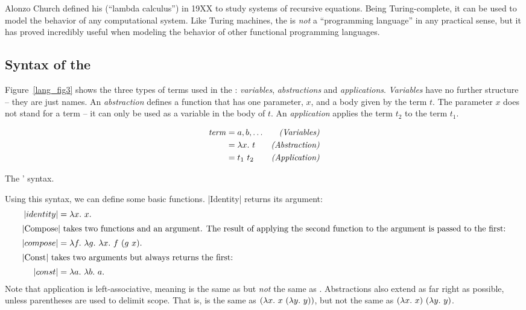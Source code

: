 \documentclass[12pt]{report}
\begin{document}
Alonzo Church defined his \lamA (``lambda calculus'') in 19XX
\citep{ChurchXX} to study systems of recursive equations. Being
Turing-complete, it can be used to model the behavior of any
computational system. Like Turing machines, the \lamA is \emph{not}
a ``programming language'' in any practical sense, but it has proved
incredibly useful when modeling the behavior of other functional
programming languages.

\subsection{Syntax of the \LamA}
\label{lang_sec1_syntax}

Figure~\ref{lang_fig3} shows the three types of terms used in the
\lamA: \emph{variables}, \emph{abstractions} and
\emph{applications}. \emph{Variables} have no further structure --
they are just names. An \emph{abstraction} defines a function that has
one parameter, $x$, and a body given by the term $t$. The parameter
$x$ does not stand for a term -- it can only be used as a variable in
the body of $t$.  An \emph{application} applies the term $t_2$ to the
term $t_1$.

\begin{myfig}[tbh]
  \begin{minipage}{5in}
    \begin{align*}
      \mathit{term} &= a, b, \ldots & \hfill\text{\emph{(Variables)}} \\
      &= \lamAbs{x}{t} & \hfill\text{\emph{(Abstraction)}} \\ 
      &= \lamApp{t_1}{t_2} & \hfill\text{\emph{(Application)}}
    \end{align*}
  \end{minipage}
  \caption{The \lamA' syntax.}
  \label{lang_fig3}
\end{myfig}

Using this syntax, we can define some basic functions. |Identity|
returns its argument:
\begin{align}
  |identity| &= \lambda x.\ x. \label{lang_eq1} \\
  \intertext{|Compose| takes two functions and an argument. The result of
    applying the second function to the argument is passed to the first:}
  |compose| &= \lambda f.\ \lambda g.\ \lambda x.\ f\ (g\ x). \label{lang_eq_compose1} \\
  \intertext{|Const| takes two arguments but always returns the first:}
  |const| &= \lambda a.\ \lambda b.\ a. \label{lang_eq_const1} 
\end{align}
Note that application is left-associative, meaning
 is the same as 
but \emph{not} the same as . Abstractions
also extend as far right as possible, unless parentheses are used to
delimit scope. That is,  is the
same as $(\lambda x.\ x\ (\lambda y.\ y))$, but not the
same as $(\lambda x.\ x)\ (\lambda y.\ y)$.
\end{document}
